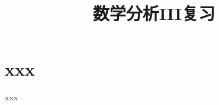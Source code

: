 \everymath{\displaystyle}



\title[数分III\\
复习]{\texorpdfstring{\Huge \bfseries 数学分析III复习}{数学分析III复习}} %
\date{}





\begin{frame}

\titlepage %

\end{frame}




\section{xxx}


\begin{frame}{xxx}



\end{frame}




